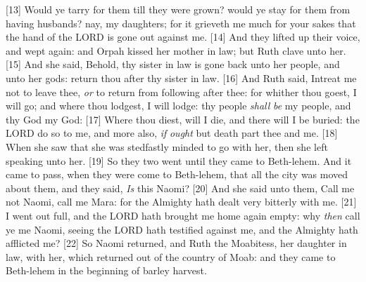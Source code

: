 [13] \textcolor[cmyk]{0.99998,1,0,0}{Would ye tarry for them till they were grown? would ye stay for them from having husbands? nay, my daughters; for it grieveth me much for your sakes that the hand of the LORD is gone out against me.}
[14] \textcolor[cmyk]{0.99998,1,0,0}{And they lifted up their voice, and wept again: and Orpah kissed her mother in law; but Ruth clave unto her.}
[15] \textcolor[cmyk]{0.99998,1,0,0}{And she said, Behold, thy sister in law is gone back unto her people, and unto her gods: return thou after thy sister in law.}
[16] \textcolor[cmyk]{0.99998,1,0,0}{And Ruth said, Intreat me not to leave thee, \emph{or} to return from following after thee: for whither thou goest, I will go; and where thou lodgest, I will lodge: thy people \emph{shall} \emph{be} my people, and thy God my God:}
[17] \textcolor[cmyk]{0.99998,1,0,0}{Where thou diest, will I die, and there will I be buried: the LORD do so to me, and more also, \emph{if} \emph{ought} but death part thee and me.}
[18] \textcolor[cmyk]{0.99998,1,0,0}{When she saw that she was stedfastly minded to go with her, then she left speaking unto her.}
[19] \textcolor[cmyk]{0.99998,1,0,0}{So they two went until they came to Beth-lehem. And it came to pass, when they were come to Beth-lehem, that all the city was moved about them, and they said, \emph{Is} this Naomi?}
[20] \textcolor[cmyk]{0.99998,1,0,0}{And she said unto them, Call me not Naomi, call me Mara: for the Almighty hath dealt very bitterly with me.}
[21] \textcolor[cmyk]{0.99998,1,0,0}{I went out full, and the LORD hath brought me home again empty: why \emph{then} call ye me Naomi, seeing the LORD hath testified against me, and the Almighty hath afflicted me?}
[22] \textcolor[cmyk]{0.99998,1,0,0}{So Naomi returned, and Ruth the Moabitess, her daughter in law, with her, which returned out of the country of Moab: and they came to Beth-lehem in the beginning of barley harvest.}
